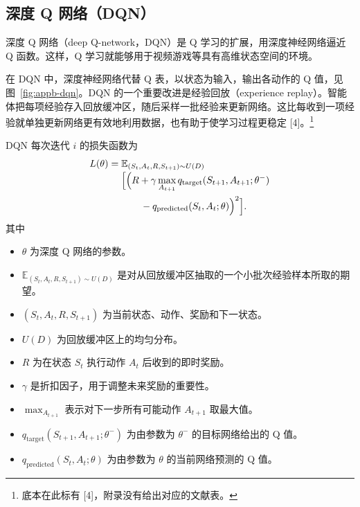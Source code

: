 \subsection{深度 Q 网络（DQN）}
\label{sec:appb-dqn}
深度 Q 网络（deep Q-network，DQN）是 Q 学习的扩展，用深度神经网络逼近 Q 函数。这样，Q 学习就能够用于视频游戏等具有高维状态空间的环境。


在 DQN 中，深度神经网络代替 Q 表，以状态为输入，输出各动作的 Q 值，见图~\ref{fig:appb-dqn}。DQN 的一个重要改进是经验回放（experience replay）。智能体把每项经验存入回放缓冲区，随后采样一批经验来更新网络。这比每收到一项经验就单独更新网络更有效地利用数据，也有助于使学习过程更稳定 [4]。\footnote{底本在此标有 [4]，附录没有给出对应的文献表。}

DQN 每次迭代 $i$ 的损失函数为
\begin{equation}
\begin{aligned}
L(\theta)={}&\mathbb{E}_{(S_t,A_t,R,S_{t+1})\sim U(D)}\\[-2pt]
&\Bigl[\Bigl(R+\gamma\max_{A_{t+1}}q_{\mathrm{target}}(S_{t+1},A_{t+1};\theta^-)\\
&\qquad-q_{\mathrm{predicted}}(S_t,A_t;\theta)\Bigr)^2\Bigr].
\end{aligned}
\label{eq:appb-dqn-loss}
\end{equation}
其中
\begin{itemize}
\item $\theta$ 为深度 Q 网络的参数。
\item $\mathbb{E}_{(S_t,A_t,R,S_{t+1})\sim U(D)}$ 是对从回放缓冲区抽取的一个小批次经验样本所取的期望。
\item $(S_t,A_t,R,S_{t+1})$ 为当前状态、动作、奖励和下一状态。
\item $U(D)$ 为回放缓冲区上的均匀分布。
\item $R$ 为在状态 $S_t$ 执行动作 $A_t$ 后收到的即时奖励。
\item $\gamma$ 是折扣因子，用于调整未来奖励的重要性。
\item $\max_{A_{t+1}}$ 表示对下一步所有可能动作 $A_{t+1}$ 取最大值。
\item $q_{\mathrm{target}}(S_{t+1},A_{t+1};\theta^-)$ 为由参数为 $\theta^-$ 的目标网络给出的 Q 值。
\item $q_{\mathrm{predicted}}(S_t,A_t;\theta)$ 为由参数为 $\theta$ 的当前网络预测的 Q 值。
\end{itemize}

